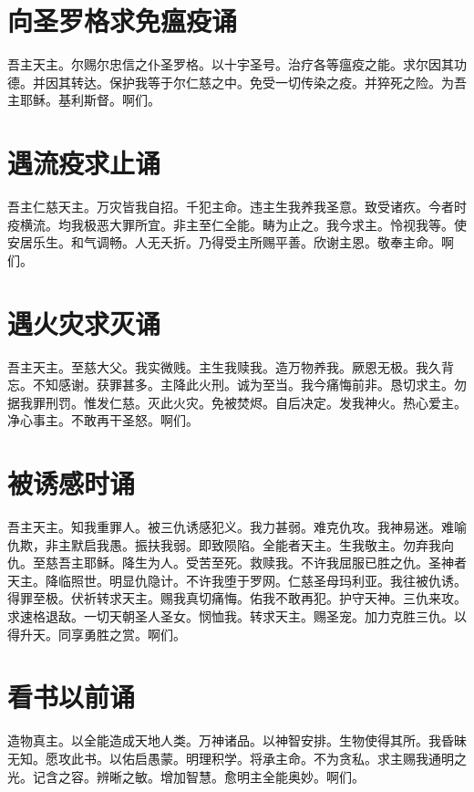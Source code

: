 \documentclass[UTF8,17pt]{ctexart}
\begin{document}
\section{向圣罗格求免瘟疫诵}

吾主天主。尔赐尔忠信之仆圣罗格。以⼗宇圣号。治疗各等瘟疫之能。求尔因其功德。并因其转达。保护我等于尔仁慈之中。免受⼀切传染之疫。并猝死之险。为吾主耶稣。基利斯督。啊们。

\section{遇流疫求⽌诵}

吾主仁慈天主。万灾皆我⾃招。千犯主命。违主⽣我养我圣意。致受诸疚。今者时疫横流。均我极恶⼤罪所宜。⾮主⾄仁全能。畴为⽌之。我今求主。怜视我等。使安居乐⽣。和⽓调畅。⼈⽆夭折。乃得受主所赐平善。欣谢主恩。敬奉主命。啊们。

\section{遇⽕灾求灭诵}

吾主天主。⾄慈⼤⽗。我实微贱。主⽣我赎我。造万物养我。厥恩⽆极。我久背忘。不知感谢。获罪甚多。主降此⽕刑。诚为⾄当。我今痛悔前⾮。恳切求主。勿据我罪刑罚。惟发仁慈。灭此⽕灾。免被焚烬。⾃后决定。发我神⽕。热⼼爱主。净⼼事主。不敢再⼲圣怒。啊们。

\section{被诱感时诵}

吾主天主。知我重罪⼈。被三仇诱感犯义。我⼒甚弱。难克仇攻。我神易迷。难喻仇欺，⾮主默启我愚。振扶我弱。即致陨陷。全能者天主。⽣我敬主。勿弃我向仇。⾄慈吾主耶稣。降⽣为⼈。受苦⾄死。救赎我。不许我屈服已胜之仇。圣神者天主。降临照世。明显仇隐计。不许我堕于罗⽹。仁慈圣母玛利亚。我往被仇诱。得罪⾄极。伏祈转求天主。赐我真切痛悔。佑我不敢再犯。护守天神。三仇来攻。求速格退敌。⼀切天朝圣⼈圣⼥。悯恤我。转求天主。赐圣宠。加⼒克胜三仇。以得升天。同享勇胜之赏。啊们。


\section{看书以前诵}

造物真主。以全能造成天地⼈类。万神诸品。以神智安排。⽣物使得其所。我昏昧⽆知。愿攻此书。以佑启愚蒙。明理积学。将承主命。不为贪私。求主赐我通明之光。记含之容。辨晰之敏。增加智慧。愈明主全能奥妙。啊们。
\end{document}

